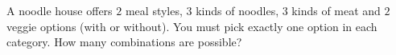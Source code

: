 A noodle house offers $2$ meal styles, $3$ kinds of noodles, $3$ kinds of meat and $2$ veggie options (with or without). You must pick exactly one option in each category. How many combinations are possible?
